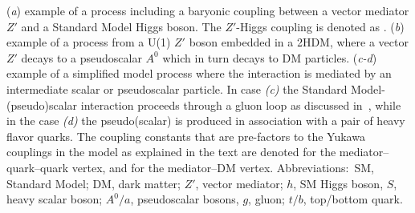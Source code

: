 (\textit{a}) example of a process including a baryonic coupling between a vector mediator $Z'$ and a Standard Model Higgs boson. The $Z'$-Higgs coupling is denoted as \ghZprimeZprime. 
(\textit{b}) example of a process from a U(1) $Z'$ boson embedded in a 2HDM, where a vector $Z'$ decays to a pseudoscalar $A^0$ which in turn decays to DM particles. 
(\textit{c-d}) example of a simplified model process where the interaction is mediated by an intermediate scalar or pseudoscalar particle. In case \textit{(c)} the Standard Model-(pseudo)scalar interaction proceeds through a gluon loop as discussed in~\cite{Haisch:2013ata}, while in the case \textit{(d)} the pseudo(scalar) is produced in association with a pair of heavy flavor quarks. The coupling constants that are pre-factors to the Yukawa couplings in the model as explained in the text are denoted \gq for the mediator--quark--quark vertex, and \gdm for the mediator--DM vertex. 
Abbreviations:\ SM, Standard Model; DM, dark matter; $Z'$, vector mediator; $h$, SM Higgs boson, $S$, heavy scalar boson; $A^0/a$, pseudoscalar bosons, $g$, gluon; $t/b$, top/bottom quark. 
